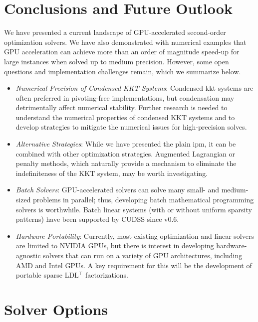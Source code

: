 \documentclass{article}
\begin{document}
\section{Conclusions and Future Outlook}\label{eqn:conclusion}
We have presented a current landscape of GPU-accelerated second-order optimization solvers.
We have also demonstrated with numerical examples that GPU acceleration can achieve more than an order of magnitude speed-up for large instances when solved up to medium precision. However, some open questions and implementation challenges remain, which we summarize below.

\begin{itemize}[leftmargin=*,itemsep=0pt,parsep=0pt,partopsep=0pt]
\item \textit{Numerical Precision of Condensed KKT Systems}: Condensed \gls*{kkt} systems are often preferred in pivoting-free implementations, but condensation may detrimentally affect numerical stability. Further research is needed to understand the numerical properties of condensed KKT systems and to develop strategies to mitigate the numerical issues for high-precision solves.
\item \textit{Alternative Strategies}: While we have presented the plain \gls*{ipm}, it can be combined with other optimization strategies. Augmented Lagrangian or penalty methods, which naturally provide a mechanism to eliminate the indefiniteness of the KKT system, may be worth investigating.
\item \textit{Batch Solvers}: GPU-accelerated solvers can solve many small- and medium-sized problems in parallel; thus, developing batch mathematical programming solvers is worthwhile. Batch linear systems (with or without uniform sparsity patterns) have been supported by CUDSS since v0.6.
\item \textit{Hardware Portability}: Currently, most existing optimization and linear solvers are limited to NVIDIA GPUs, but there is interest in developing hardware-agnostic solvers that can run on a variety of GPU architectures, including AMD and Intel GPUs. A key requirement for this will be the development of portable sparse LDL$^\top$ factorizations.
\end{itemize}





\appendix
{}

\section{Solver Options}\label{apx:num}
\end{document}

